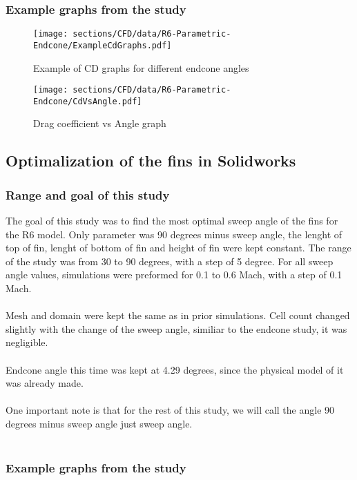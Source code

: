 \subsubsection{Example graphs from the study}

\begin{figure}[H]
    \centering
    \texttt{[image: sections/CFD/data/R6-Parametric-Endcone/ExampleCdGraphs.pdf]}
    \caption{Example of CD graphs for different endcone angles}
\end{figure}


\begin{figure}[H]
    \centering
    \texttt{[image: sections/CFD/data/R6-Parametric-Endcone/CdVsAngle.pdf]}
    \caption{Drag coefficient vs Angle graph}
    \label{fig:CdVsAngleEndcone}
\end{figure}



\subsection{Optimalization of the fins in Solidworks}
\subsubsection{Range and goal of this study}
The goal of this study was to find the most optimal sweep angle of the fins for the R6 model. 
Only parameter was 90 degrees minus sweep angle, the lenght of top of fin, lenght of bottom of fin and height of 
fin were kept constant. The range of the study was from 30 to 90 degrees, with a step of 5 degree. 
For all sweep angle values, simulations were preformed for 0.1 to 0.6 Mach, with a step of 0.1 Mach.\\\\
Mesh and domain were kept the same as in prior simulations. Cell count changed slightly with the 
change of the sweep angle, similiar to the endcone study, it was negligible.\\\\
Endcone angle this time was kept at 4.29 degrees, since the physical model of it was already made.\\\\
One important note is that for the rest of this study, we will call the angle 90 degrees minus sweep 
angle just sweep angle.\\\\


\subsubsection{Example graphs from the study}

